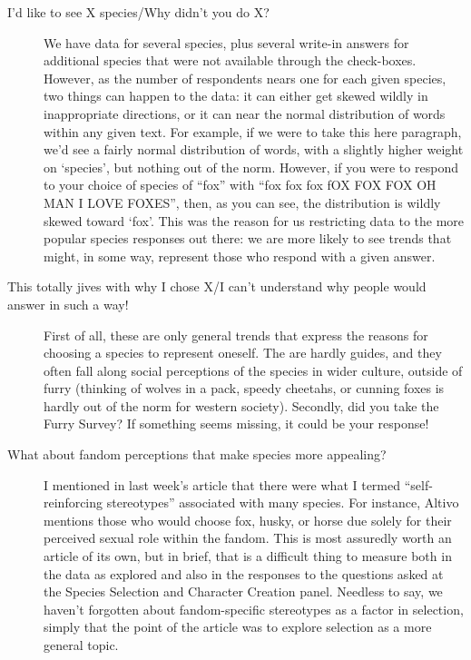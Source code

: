 \begin{description}
  \item[I'd like to see X species/Why didn't you do X?] We have data for several species, plus several write-in answers for additional species that were not available through the check-boxes.  However, as the number of respondents nears one for each given species, two things can happen to the data: it can either get skewed wildly in inappropriate directions, or it can near the normal distribution of words within any given text.  For example, if we were to take this here paragraph, we'd see a fairly normal distribution of words, with a slightly higher weight on `species', but nothing out of the norm.  However, if you were to respond to your choice of species of ``fox'' with ``fox fox fox fOX FOX FOX OH MAN I LOVE FOXES'', then, as you can see, the distribution is wildly skewed toward `fox'.  This was the reason for us restricting data to the more popular species responses out there: we are more likely to see trends that might, in some way, represent those who respond with a given answer.
  \item[This totally jives with why I chose X/I can't understand why people would answer in such a way!] First of all, these are only general trends that express the reasons for choosing a species to represent oneself.  The are hardly guides, and they often fall along social perceptions of the species in wider culture, outside of furry (thinking of wolves in a pack, speedy cheetahs, or cunning foxes is hardly out of the norm for western society).  Secondly, did you take the Furry Survey? If something seems missing, it could be your response!
  \item[What about fandom perceptions that make species more appealing?] I mentioned in last week's article that there were what I termed ``self-reinforcing stereotypes'' associated with many species.  For instance, Altivo mentions those who would choose fox, husky, or horse due solely for their perceived sexual role within the fandom.  This is most assuredly worth an article of its own, but in brief, that is a difficult thing to measure both in the data as explored and also in the responses to the questions asked at the Species Selection and Character Creation panel.  Needless to say, we haven't forgotten about fandom-specific stereotypes as a factor in selection, simply that the point of the article was to explore selection as a more general topic.

\end{description}
